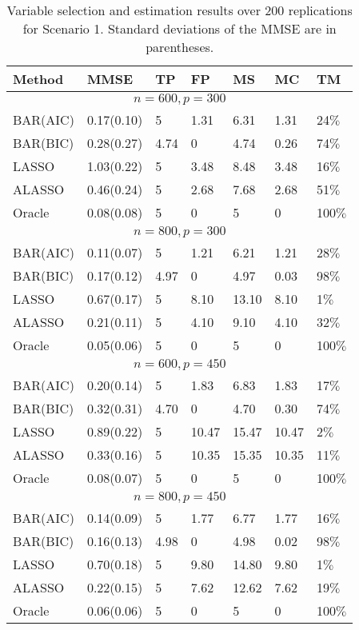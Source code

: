 \documentclass[11pt]{article}
\begin{document}
\begin{table}
\centering
\caption{Variable selection and estimation results over 200 replications for Scenario 1. Standard deviations of the MMSE are in parentheses.} \label{SS}
\begin{tabular}{l|llllll}
\hline
 Method & MMSE & TP & FP & MS & MC & TM \\
\hline
\multicolumn{7}{c}{$n=600,p=300$} \\
\hline
BAR(AIC) & 0.17(0.10) & 5 & 1.31 & 6.31 & 1.31 & 24$\%$ \\
BAR(BIC) & 0.28(0.27) & 4.74 & 0 & 4.74 & 0.26 & 74$\%$ \\
LASSO & 1.03(0.22) & 5 & 3.48 & 8.48 & 3.48 & 16$\%$  \\
ALASSO & 0.46(0.24) & 5 & 2.68 & 7.68 & 2.68 & 51$\%$  \\
Oracle & 0.08(0.08) & 5 & 0 & 5 & 0 & 100$\%$ \\
\hline
\multicolumn{7}{c}{$n=800,p=300$} \\
\hline
BAR(AIC) & 0.11(0.07) & 5 & 1.21 & 6.21 & 1.21 & 28$\%$ \\
BAR(BIC) & 0.17(0.12) & 4.97 & 0 & 4.97 & 0.03 & 98$\%$ \\
LASSO & 0.67(0.17) & 5 & 8.10 & 13.10 & 8.10 & 1$\%$   \\
ALASSO & 0.21(0.11) & 5 & 4.10 & 9.10 & 4.10 & 32$\%$  \\
Oracle & 0.05(0.06) & 5 & 0 & 5 & 0 & 100$\%$ \\
\hline
\multicolumn{7}{c}{$n=600,p=450$} \\
\hline
BAR(AIC) & 0.20(0.14) & 5 & 1.83 & 6.83 & 1.83 & 17$\%$  \\
BAR(BIC) & 0.32(0.31) & 4.70 & 0 & 4.70 & 0.30 & 74$\%$ \\
LASSO & 0.89(0.22) & 5 & 10.47 & 15.47 & 10.47 & 2$\%$  \\
ALASSO & 0.33(0.16) & 5 & 10.35 & 15.35 & 10.35 & 11$\%$  \\
Oracle & 0.08(0.07) & 5 & 0 & 5 & 0 & 100$\%$ \\
\hline
\multicolumn{7}{c}{$n=800,p=450$} \\
\hline
BAR(AIC) & 0.14(0.09) & 5 & 1.77 & 6.77 & 1.77 & 16$\%$  \\
BAR(BIC) & 0.16(0.13) & 4.98 & 0 & 4.98 & 0.02 & 98$\%$ \\
LASSO& 0.70(0.18) & 5 & 9.80 & 14.80 & 9.80 & 1$\%$  \\
ALASSO & 0.22(0.15) & 5 & 7.62 & 12.62 & 7.62 & 19$\%$  \\ 
Oracle & 0.06(0.06) & 5 & 0 & 5 & 0 & 100$\%$ \\
\hline
\end{tabular}
\end{table}
\end{document}
